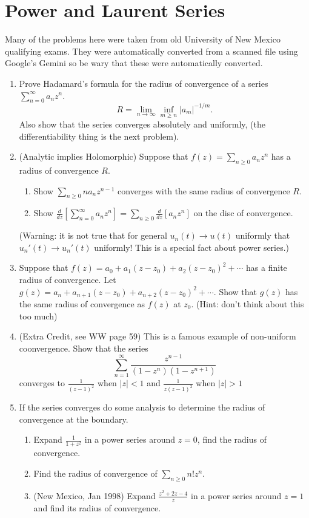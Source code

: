 \documentclass[a4paper,10pt]{article}
\begin{document}
\newpage 
\section{Power and Laurent Series}

Many of the problems here were taken from old University of New Mexico qualifying exams. They were automatically converted from a scanned file using Google's Gemini so be wary that these were automatically converted.

\begin{enumerate}

\item Prove Hadamard's formula for the radius of convergence of a series $\sum_{n=0}^{\infty} a_n z^n$.
 $$ R = \lim_{n\to \infty} \inf_{m\geq n} \vert a_m \vert^{-1/m}.$$
Also show that the series converges absolutely and uniformly, (the differentiability thing is the next problem).

\item (Analytic implies Holomorphic) Suppose that $f(z) = \sum_{n\geq0} a_n z^n$ has a radius of convergence $R$. 
\begin{enumerate}
 \item Show $\sum_{n\geq 0} n a_n z^{n-1}$ converges with the same radius of convergence $R$.
 \item Show $\frac{d}{dz}\left[ \sum_{n=0}^{\infty} a_nz^{n}\right] = \sum_{n\geq 0} \frac{d}{dz}[ a_n z^{n}]$ on the disc of convergence.
\end{enumerate}
(Warning: it is not true that for general $u_n(t)\to u(t)$ uniformly that $u_n'(t) \to u_n'(t)$ uniformly! This is a special fact about power series.)


\item Suppose that $f(z) = a_0 + a_1(z-z_0) + a_2 (z-z_0)^2 + \cdots$ has a finite radius of convergence. 
Let $g(z) = a_n+ a_{n+1} (z-z_0) + a_{n+2}(z-z_0)^2 + \cdots$. Show that $g(z)$ has the same radius of convergence as $f(z)$ at $z_0$. (Hint: don't think about this too much)


\item (Extra Credit, see WW page 59) This is a famous example of non-uniform coonvergence. Show that the series
 $$ \sum_{n =1}^{\infty} \frac{z^{n-1} }{(1-z^n)(1-z^{n+1})}$$
 converges to $\frac{1}{(z-1)^2}$ when $\vert z \vert <1$ and $\frac{1}{z(z-1)^2}$ when $\vert z \vert > 1$


\item 
If the series converges do some analysis to determine the radius of convergence at the boundary.
\begin{enumerate}
\item Expand $\frac{1}{1+z^2}$ in a power series around $z=0$, find the radius of convergence.
\item Find the radius of convergence of $\sum_{n\geq 0} n! z^n$.
\item (New Mexico, Jan 1998) Expand $\frac{z^2+2z-4}{z}$ in a power series around $z=1$ and find its radius of convergence.
\end{enumerate}



\end{enumerate}
\end{document}
